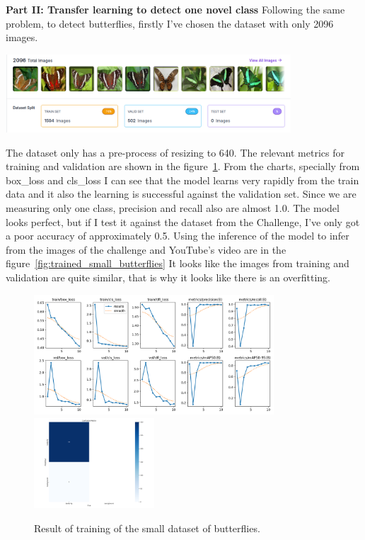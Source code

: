 \documentclass{cpsc202}
\begin{document}
    \newpage
    \large\textbf{Part II: Transfer learning to detect one novel class}
    Following the same problem, to detect butterflies, firstly I've chosen the dataset with only 2096 images.
    \begin{center}
        \includegraphics[width=0.8\textwidth]{trained_small_butterflies/dataset_simple}
    \end{center}
    The dataset only has a pre-process of resizing to 640.
    The relevant metrics for training and validation are shown in the figure~\ref{fig:results-small}.
    From the charts, specially from box\_loss and cls\_loss I can see that the model learns very rapidly from the train data and it also the learning is successful against the validation set.
    Since we are measuring only one class, precision and recall also are almost 1.0.
    The model looks perfect, but if I test it against the dataset from the Challenge, I've only got a poor accuracy of approximately 0.5.
    Using the inference of the model to infer from the images of the challenge and YouTube's video are in the figure~\ref{fig:trained_small_butterflies}
    It looks like the images from training and validation are quite similar, that is why it looks like there is an overfitting.
    \begin{figure}
        \begin{center}
            \includegraphics[width=0.8\textwidth]{trained_small_butterflies/results}
            \includegraphics[width=0.4\textwidth]{trained_small_butterflies/confusion_matrix_simple}
        \end{center}
        \caption{Result of training of the small dataset of butterflies.}
        \label{fig:results-small}
    \end{figure}
\end{document}
